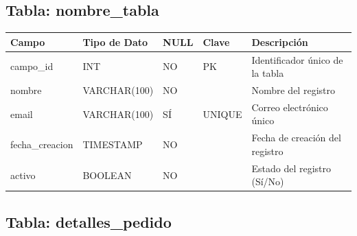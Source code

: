 


\subsection{Tabla: nombre_tabla}

\begin{center}
\begin{tabular}{|l|l|l|l|p{4cm}|}
    \hline
    \textbf{Campo} & \textbf{Tipo de Dato} & \textbf{NULL} & \textbf{Clave} & \textbf{Descripción} \\
    \hline
    campo_id & INT & NO & PK & Identificador único de la tabla \\
    \hline
    nombre & VARCHAR(100) & NO & & Nombre del registro \\
    \hline
    email & VARCHAR(100) & SÍ & UNIQUE & Correo electrónico único \\
    \hline
    fecha_creacion & TIMESTAMP & NO & & Fecha de creación del registro \\
    \hline
    activo & BOOLEAN & NO & & Estado del registro (Sí/No) \\
    \hline
\end{tabular}
\end{center}


\subsection{Tabla: detalles_pedido}

